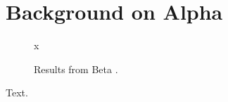 \documentclass{article}
\begin{document}
\tableofcontents
\section{Background on Alpha \cite{ka}}
\begin{figure}\centering x \caption{Results from Beta \cite{kb}.}\end{figure}
Text.


\end{document}
